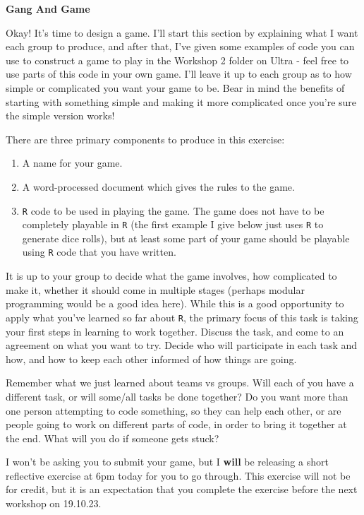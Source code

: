 \documentclass[11pt,a4paper]{article}
\begin{document}
\newpage

\vspace{0.2cm}
\textbf{Gang And Game}
\vspace{0.2cm}

Okay! It's time to design a game. I'll start this section by explaining what I want each group to produce, and after that, I've given some examples of code you can use to construct a game to play in the Workshop 2 folder on Ultra - feel free to use parts of this code in your own game.  I'll leave it up to each group as to how simple or complicated you want your game to be. Bear in mind the benefits of starting with something simple and making it more complicated once you're sure the simple version works!

There are three primary components to produce in this exercise:
\begin{enumerate}
\item A name for your game.
\item A word-processed document which gives the rules to the game.
\item \texttt{R} code to be used in playing the game. The game does not have to be completely playable in \texttt{R} (the first example I give below just uses \texttt{R} to generate dice rolls), but at least some part of your game should be playable using \texttt{R} code that you have written.
\end{enumerate}
It is up to your group to decide what the game involves, how complicated to make it, whether it should come in multiple stages (perhaps modular programming would be a good idea here). While this is a good opportunity to apply what you've learned so far about \texttt{R}, the primary focus of this task is taking your first steps in learning to work together. Discuss the task, and come to an agreement on what you want to try. Decide who will participate in each task and how, and how to keep each other informed of how things are going. 

Remember what we just learned about teams vs groups. Will each of you have a different task, or will some/all tasks be done together? Do you want more than one person attempting to code something, so they can help each other, or are people going to work on different parts of code, in order to bring it together at the end. What will you do if someone gets stuck?

I won't be asking you to submit your game, but I \textbf{will} be releasing a short reflective exercise at 6pm today for you to go through. This exercise will not be for credit, but it is an expectation that you complete the exercise before the next workshop on 19.10.23.
 
 
\end{document}
